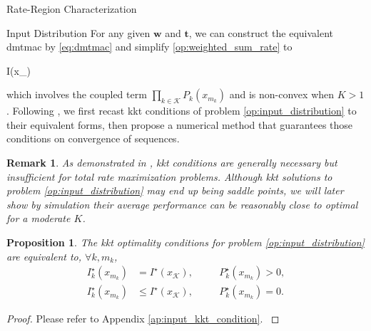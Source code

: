 \documentclass[journal]{IEEEtran}
\newtheorem{proposition}{Proposition}
\newtheorem{remark}{Remark}
\begin{document}
\begin{section}{Rate-Region Characterization}
	\begin{subsection}{Input Distribution}
		For any given $\boldsymbol{w}$ and $\boldsymbol{t}$, we can construct the equivalent \gls{dmtmac} by \eqref{eq:dmtmac} and simplify \eqref{op:weighted_sum_rate} to
		\begin{maxi!}
			{}{I(x_{})}{\label{op:input_distribution}}{}
			\addConstraint{\eqref{co:sum_probability},\eqref{co:nonnegative_probability},}
		\end{maxi!}
		which involves the coupled term $\prod_{k \in \mathcal{K}} P_k(x_{m_k})$ and is non-convex when $K > 1$.
		Following \cite{Rezaeian2004}, we first recast \gls{kkt} conditions of problem \eqref{op:input_distribution} to their equivalent forms, then propose a numerical method that guarantees those conditions on convergence of sequences.
		\begin{remark}
			As demonstrated in \cite{Buhler2011}, \gls{kkt} conditions are generally necessary but insufficient for total rate maximization problems.
			Although \gls{kkt} solutions to problem \eqref{op:input_distribution} may end up being saddle points, we will later show by simulation their average performance can be reasonably close to optimal for a moderate $K$.
			\label{re:input_kkt_distribution}
		\end{remark}
		\begin{proposition}
			The \gls{kkt} optimality conditions for problem \eqref{op:input_distribution} are equivalent to, $\forall k,m_k$,
			\begin{subequations}
				\label{eq:input_kkt_condition}
				\begin{alignat}{2}
					I_k^\star(x_{m_k}) & = I^\star(x_{\mathcal{K}}), \quad   &  & P_k^\star(x_{m_k}) > 0,\label{eq:probable_states} \\
					I_k^\star(x_{m_k}) & \le I^\star(x_{\mathcal{K}}), \quad &  & P_k^\star(x_{m_k}) = 0.\label{eq:dropped_states}
				\end{alignat}
			\end{subequations}
			\label{pr:input_kkt_condition}
		\end{proposition}

		\begin{proof}
			Please refer to Appendix \ref{ap:input_kkt_condition}.
			\label{pf:input_kkt_condition}
		\end{proof}


\end{subsection}
\end{section}
\end{document}
